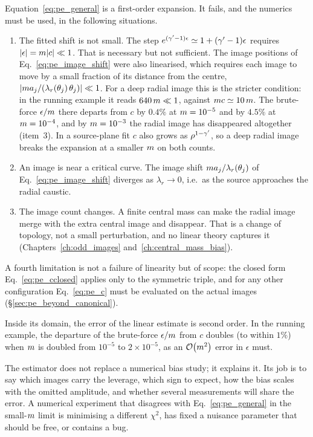 Equation~\eqref{eq:pe_general} is a first-order expansion. It fails, and
the numerics must be used, in the following situations.
\begin{enumerate}
    \item The fitted shift is not small. The step
          $e^{(\gamma'-1)\epsilon}\simeq1+(\gamma'-1)\epsilon$ requires
          $|\epsilon|=m|c|\ll1$. That is necessary but not
          sufficient. The image positions of
          Eq.~\eqref{eq:pe_image_shift} were also linearised, which
          requires each image to move by a small fraction of its
          distance from the centre,
          $|m a_j/(\lambda_r(\theta_j)\,\theta_j)|\ll1$. For a deep
          radial image this is the stricter condition: in the running
          example it reads $640\,m\ll1$, against
          $m c\simeq10\,m$. The brute-force $\epsilon/m$ there
          departs from $c$ by $0.4\%$ at $m=10^{-5}$ and by $4.5\%$ at
          $m=10^{-4}$, and by $m=10^{-3}$ the radial image has
          disappeared altogether (item~3). In a source-plane fit $c$ also
          grows as $\rho^{1-\gamma'}$, so a deep radial image breaks the
          expansion at a smaller $m$ on both counts.
    \item An image is near a critical curve. The image shift
          $m a_j/\lambda_r(\theta_j)$ of Eq.~\eqref{eq:pe_image_shift}
          diverges as $\lambda_r\to0$, i.e.\ as the source approaches
          the radial caustic.
    \item The image count changes. A finite central mass can
          make the radial image merge with the extra central image and
          disappear. That is a change of topology, not a small
          perturbation, and no linear theory captures it
          (Chapters~\ref{ch:odd_images} and~\ref{ch:central_mass_bias}).
\end{enumerate}
A fourth limitation is not a failure of linearity but of scope: the
closed form Eq.~\eqref{eq:pe_cclosed} applies only to the symmetric
triple, and for any other configuration Eq.~\eqref{eq:pe_c} must be
evaluated on the actual images (\S\ref{sec:pe_beyond_canonical}).

Inside its domain, the error of the linear estimate is second order.
In the running example, the departure of the brute-force
$\epsilon/m$ from $c$ doubles (to within $1\%$) when $m$ is
doubled from $10^{-5}$ to $2\times10^{-5}$, as an $\mathcal{O}\!\left(m^2\right)$ error
in $\epsilon$ must.

\begin{annotation}
The estimator does not replace a numerical bias study; it explains it.
Its job is to say which images carry the leverage, which sign to
expect, how the bias scales with the omitted amplitude, and whether
several measurements will share the error. A numerical experiment that
disagrees with Eq.~\eqref{eq:pe_general} in the small-$m$ limit is
minimising a different $\chi^2$, has fixed a nuisance parameter that
should be free, or contains a bug.
\end{annotation}

